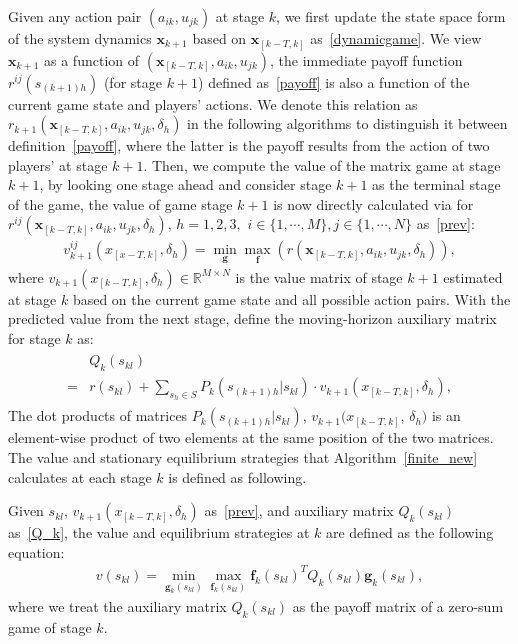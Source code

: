 Given any action pair $(a_{ik},u_{jk})$ at stage $k$, we first update the state space form of the system dynamics $\mathbf{x}_{k+1}$ based on $\mathbf{x}_{[k-T,k]}$ as~\eqref{dynamicgame}. We view $\mathbf{x}_{k+1}$ as a function of $(\mathbf{x}_{[k-T, k]}, a_{ik},u_{jk})$, the immediate payoff function ${r}^{ij}(s_{(k+1)h})$ (for stage $k+1$) defined as~\eqref{payoff} is also a function of the current game state and players' actions. We denote this relation as $r_{k+1}(\mathbf{x}_{[k-T, k]}, a_{ik},u_{jk}, \delta_h)$ in the following algorithms to distinguish it between definition~\eqref{payoff}, where the latter is the payoff results from the action of two players' at stage $k+1$. Then, we compute the value of the matrix game at stage $k+1$, by looking one stage ahead and consider stage $k+1$ as the terminal stage of the game, the value of game stage $k+1$ is now directly calculated via for $r^{ij}(\mathbf{x}_{[k-T,k]},a_{ik},u_{jk},\delta_h)$, $h=1,2,3,$ $i\in \{1,\cdots, M\}, j \in \{1,\cdots, N\}$ as~\eqref{prev}:
\begin{align}
v^{ij}_{k+1}(x_{[x-T,k]},\delta_h)= \min\limits_{\mathbf{g}}\max\limits_{\mathbf{f}}(r(\mathbf{x}_{[k-T,k]},a_{ik},u_{jk},\delta_h)),
\label{prev}
\end{align}
where $v_{k+1}(x_{[k-T,k]},\delta_h) \in \mathbb{R}^{M \times N}$ is the value matrix of stage $k+1$ estimated at stage $k$ based on the current game state and all possible action pairs. With the predicted value from the next stage, define the moving-horizon auxiliary matrix for stage $k$ as:
\begin{align}
\begin{split}
&Q_{k}(s_{kl})\\=&r(s_{kl})
                         +\sum_{s_h\in S} P_k( s_{(k+1)h} |s_{kl})\cdot v_{k+1}(x_{[k-T,k]},\delta_h),
\end{split}
\label{Q_k}
\end{align}
The dot products of matrices ${P}_{k}( s_{(k+1)h} |s_{kl})$, $v_{k+1}(x_{[k-T,k]}$, $\delta_h)$ is an element-wise product of two elements at the same position of the two matrices. The value and stationary equilibrium strategies that Algorithm~\ref{finite_new} calculates at each stage $k$ is defined as following.
\begin{defn}
Given $s_{kl}$, $v_{k+1}(x_{[k-T,k]},\delta_h)$ as~\eqref{prev}, and auxiliary matrix $Q_{k}(s_{kl})$ as~\eqref{Q_k}, the value and equilibrium strategies at $k$ are defined as the following equation: 
\begin{align}
v(s_{kl})= \min\limits_{\mathbf{g}_k(s_{kl})}\max\limits_{\mathbf{f}_k(s_{kl})} \mathbf{f}_k(s_{kl})^T Q_{k}(s_{kl}) \mathbf{g}_k(s_{kl}),
\label{v_k}
\end{align}
where we treat the auxiliary matrix $Q_{k}(s_{kl})$ as the payoff matrix of a zero-sum game of stage $k$. 
\end{defn}

